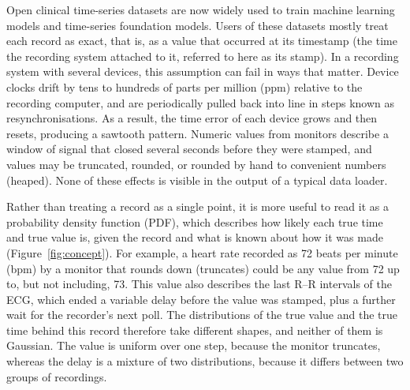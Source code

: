 \documentclass[11pt,a4paper]{article}
\makeatletter
\newcommand{\fact}[1]{\@ifundefined{fact@#1}{\textcolor{red}{??#1}}{\@nameuse{fact@#1}}}
\makeatother
\begin{document}
Open clinical time-series datasets are now widely used to train machine learning models and time-series
foundation models. Users of these datasets mostly treat each record as exact, that is, as a value that occurred at
its timestamp (the time the recording system attached to it, referred to here as its stamp). In a recording system
with several devices, this assumption can fail in ways that matter. Device clocks drift by tens to hundreds of parts
per million (ppm) relative to the recording computer, and are periodically pulled back into line in steps known as
resynchronisations. As a result, the time error of each device grows and then resets, producing a sawtooth pattern.
Numeric values from monitors describe a window of signal that closed several seconds before they were stamped, and
values may be truncated, rounded, or rounded by hand to convenient numbers (heaped). None of these effects is visible in the output of a typical data loader.

Rather than treating a record as a single point, it is more useful to read it as a probability density function (PDF),
which describes how likely each true time and true value is, given the record and what is known about how it was made
(Figure~\ref{fig:concept}). For example, a heart rate recorded as 72 beats per minute (bpm) by a monitor that rounds
down (truncates) could be any value from 72 up to, but not including, 73. This value also describes the last
\fact{hr.window} R--R intervals of the ECG, which ended a variable delay before the value was stamped, plus a further
wait for the recorder's next poll. The distributions of the true value and the true time behind this record therefore
take different shapes, and neither of them is Gaussian. The value is uniform over one step, because the monitor
truncates, whereas the delay is a mixture of two distributions, because it differs between two groups of recordings.
\end{document}
